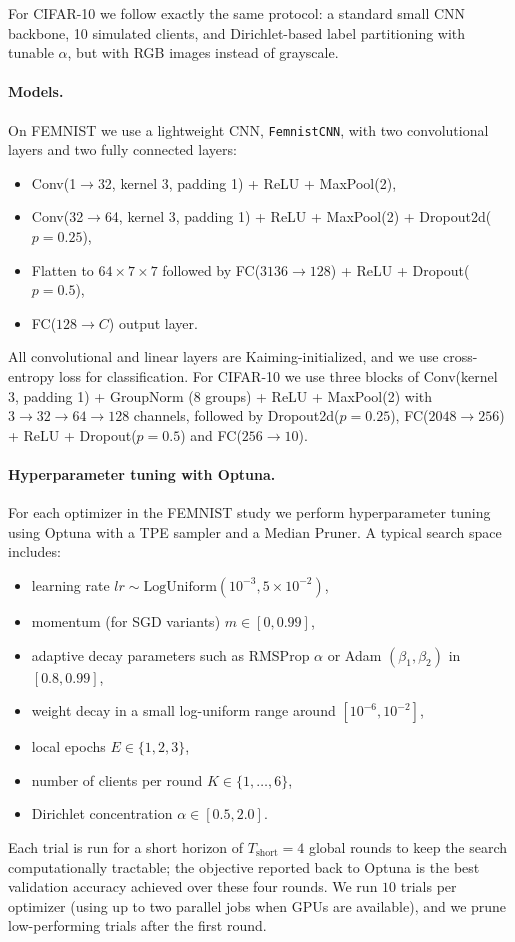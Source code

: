 \documentclass[10pt,twocolumn,letterpaper]{article}
\begin{document}
For CIFAR-10 we follow exactly the same protocol: a standard small CNN
backbone, 10 simulated clients, and Dirichlet-based label partitioning
with tunable $\alpha$, but with RGB images instead of grayscale.

\paragraph{Models.}
On FEMNIST we use a lightweight CNN, \texttt{FemnistCNN}, with two
convolutional layers and two fully connected layers:
\begin{itemize}
    \item Conv(1$\to$32, kernel 3, padding 1) + ReLU + MaxPool(2),
    \item Conv(32$\to$64, kernel 3, padding 1) + ReLU + MaxPool(2)
          + Dropout2d($p=0.25$),
    \item Flatten to $64\times 7 \times 7$ followed by
          FC($3136\to 128$) + ReLU + Dropout($p=0.5$),
    \item FC($128\to C$) output layer.
\end{itemize}
All convolutional and linear layers are Kaiming-initialized, and we use
cross-entropy loss for classification.  For CIFAR-10 we use three blocks of
Conv(kernel 3, padding 1) + GroupNorm (8 groups) + ReLU + MaxPool(2) with
$3\to32\to64\to128$ channels, followed by Dropout2d($p=0.25$),
FC($2048\to256$) + ReLU + Dropout($p=0.5$) and FC($256\to10$).

\paragraph{Hyperparameter tuning with Optuna.}
For each optimizer in the FEMNIST study we perform hyperparameter
tuning using Optuna with a TPE sampler and a Median Pruner.  A typical
search space includes:
\begin{itemize}
    \item learning rate $lr \sim \mathrm{LogUniform}(10^{-3}, 5\times10^{-2})$,
    \item momentum (for SGD variants) $m \in [0, 0.99]$,
    \item adaptive decay parameters such as RMSProp $\alpha$ or Adam
          $(\beta_1,\beta_2)$ in $[0.8, 0.99]$,
    \item weight decay in a small log-uniform range around $[10^{-6},10^{-2}]$,
    \item local epochs $E \in \{1,2,3\}$,
    \item number of clients per round $K \in \{1,\dots,6\}$,
    \item Dirichlet concentration $\alpha \in [0.5, 2.0]$.
\end{itemize}
Each trial is run for a short horizon of $T_{\text{short}} = 4$ global
rounds to keep the search computationally tractable; the objective
reported back to Optuna is the best validation accuracy achieved over
these four rounds.  We run $10$ trials per optimizer (using up to two
parallel jobs when GPUs are available), and we prune low-performing
trials after the first round.
\end{document}
